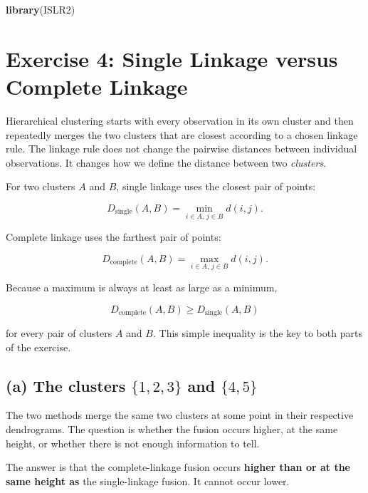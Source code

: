 \documentclass[
  11pt,
]{article}
\author{}
\date{\vspace{-2.5em}}
\newenvironment{Shaded}{\begin{snugshade}}{\end{snugshade}}
\newcommand{\FunctionTok}[1]{\textcolor[rgb]{0.13,0.29,0.53}{\textbf{#1}}}
\newcommand{\NormalTok}[1]{#1}
\begin{document}

\begin{Shaded}
\begin{Highlighting}[]
\FunctionTok{library}\NormalTok{(ISLR2)}
\end{Highlighting}
\end{Shaded}

\section{Exercise 4: Single Linkage versus Complete
Linkage}\label{exercise-4-single-linkage-versus-complete-linkage}

Hierarchical clustering starts with every observation in its own cluster
and then repeatedly merges the two clusters that are closest according
to a chosen linkage rule. The linkage rule does not change the pairwise
distances between individual observations. It changes how we define the
distance between two \emph{clusters}.

For two clusters \(A\) and \(B\), single linkage uses the closest pair
of points:

\[
D_{\mathrm{single}}(A,B) = \min_{i\in A,\,j\in B} d(i,j).
\]

Complete linkage uses the farthest pair of points:

\[
D_{\mathrm{complete}}(A,B) = \max_{i\in A,\,j\in B} d(i,j).
\]

Because a maximum is always at least as large as a minimum,

\[
D_{\mathrm{complete}}(A,B) \geq D_{\mathrm{single}}(A,B)
\]

for every pair of clusters \(A\) and \(B\). This simple inequality is
the key to both parts of the exercise.

\subsection{\texorpdfstring{(a) The clusters \(\{1,2,3\}\) and
\(\{4,5\}\)}{(a) The clusters \textbackslash\{1,2,3\textbackslash\} and \textbackslash\{4,5\textbackslash\}}}\label{a-the-clusters-123-and-45}

The two methods merge the same two clusters at some point in their
respective dendrograms. The question is whether the fusion occurs
higher, at the same height, or whether there is not enough information
to tell.

The answer is that the complete-linkage fusion occurs \textbf{higher
than or at the same height as} the single-linkage fusion. It cannot
occur lower.
\end{document}
